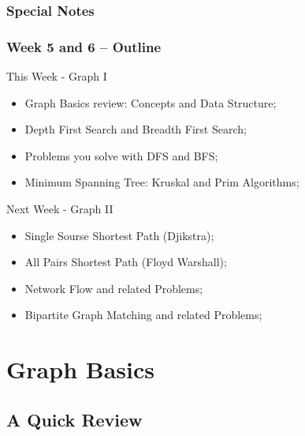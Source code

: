 \documentclass{beamer}
\begin{document}
\begin{frame}
  \frametitle{Special Notes}
\end{frame}

\begin{frame}
  \frametitle{Week 5 and 6 -- Outline}
  {\smaller
  \begin{block}{This Week - Graph I}
    \begin{itemize}
    \item Graph Basics review: Concepts and Data Structure;
    \item Depth First Search and Breadth First Search;
    \item Problems you solve with DFS and BFS;
    \item Minimum Spanning Tree: Kruskal and Prim Algorithms;
     \end{itemize}
  \end{block}
  \begin{block}{Next Week - Graph II}
    \begin{itemize}
    \item Single Sourse Shortest Path (Djikstra);
    \item All Pairs Shortest Path (Floyd Warshall);   
    \item Network Flow and related Problems;
    \item Bipartite Graph Matching and related Problems;
    \end{itemize}
  \end{block}}
\end{frame}

\section{Graph Basics}
\subsection{A Quick Review}
\end{document}
